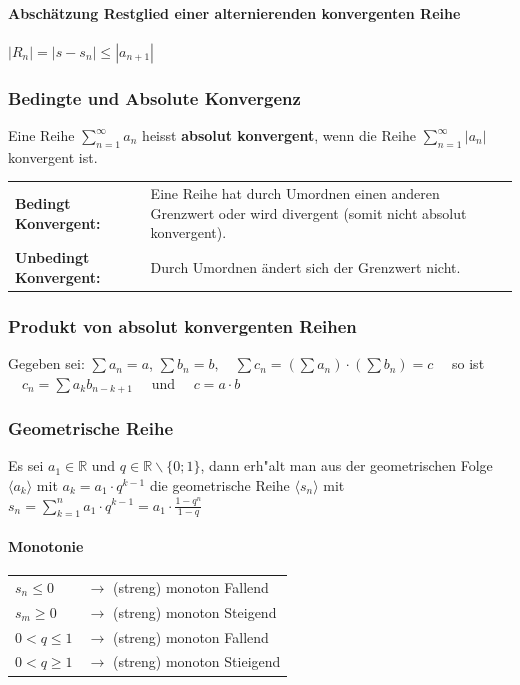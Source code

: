 \paragraph{Abschätzung Restglied einer alternierenden konvergenten Reihe}
	\qquad $|R_n| = |s-s_n|\leq |a_{n+1}|$



\subsubsection{Bedingte und Absolute Konvergenz}
Eine Reihe $\sum\limits_{n=1}^{\infty}a_n$ heisst \textbf{absolut konvergent}, wenn die
Reihe $\sum\limits_{n=1}^{\infty}|a_n|$ konvergent ist.\\

\begin{tabular}{ p{4.5cm}  p{13.5cm}}
	\textbf{Bedingt Konvergent:} &  Eine Reihe hat durch Umordnen einen anderen Grenzwert oder wird divergent (somit nicht absolut konvergent).\\
	\textbf{Unbedingt Konvergent:} &  Durch Umordnen ändert sich der Grenzwert nicht.\\
\end{tabular}


\subsubsection{Produkt von absolut konvergenten Reihen} 
Gegeben sei: $\sum a_n=a$, \quad $\sum b_n=b, \quad \sum c_n = (\sum a_n) \cdot (\sum b_n) = c \quad $ so ist
$ \quad c_n=\sum a_kb_{n-k+1} \quad $ und $ \quad c = a \cdot b $
	
\subsubsection{Geometrische Reihe}
Es sei $a_1\in\mathbb R$ und $q\in\mathbb R \backslash \{0;1\}$, dann erh"alt
man aus der geometrischen Folge $\langle a_k \rangle$ mit $a_k=a_1 \cdot
q^{k-1}$ die geometrische Reihe $\langle s_n \rangle$ mit
\textbf{$s_n= \sum\limits_{k=1}^{n} a_1 \cdot q^{k-1}=a_1 \cdot
\frac{1-q^n}{1-q}$\\}
\paragraph{Monotonie}
\begin{tabular}{ll}
$s_n \leq 0$&$\to$ (streng) monoton Fallend\\
$s_m \geq 0$&$\to$ (streng) monoton Steigend\\
$0 < q \leq 1$&$\to$ (streng) monoton Fallend\\
$0 < q \geq 1$&$\to$ (streng) monoton Stieigend\\
\end{tabular}

